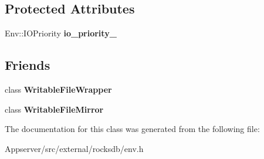 \subsection*{Protected Attributes}
\begin{DoxyCompactItemize}
\item 
Env\+::\+I\+O\+Priority {\bfseries io\+\_\+priority\+\_\+}\hypertarget{classrocksdb_1_1WritableFile_aada9395077a22ccbbf9a1dc89c119388}{}\label{classrocksdb_1_1WritableFile_aada9395077a22ccbbf9a1dc89c119388}

\end{DoxyCompactItemize}
\subsection*{Friends}
\begin{DoxyCompactItemize}
\item 
class {\bfseries Writable\+File\+Wrapper}\hypertarget{classrocksdb_1_1WritableFile_ae666395d2b922329f7f6fe7befd9136a}{}\label{classrocksdb_1_1WritableFile_ae666395d2b922329f7f6fe7befd9136a}

\item 
class {\bfseries Writable\+File\+Mirror}\hypertarget{classrocksdb_1_1WritableFile_a08ca6d7a158add6892be69f24263e128}{}\label{classrocksdb_1_1WritableFile_a08ca6d7a158add6892be69f24263e128}

\end{DoxyCompactItemize}


The documentation for this class was generated from the following file\+:\begin{DoxyCompactItemize}
\item 
Appserver/src/external/rocksdb/env.\+h\end{DoxyCompactItemize}
